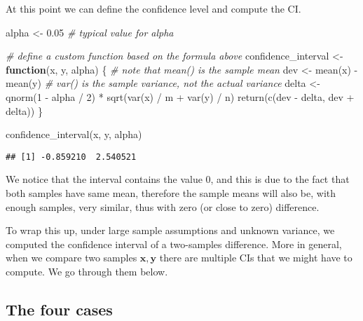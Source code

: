 \documentclass[
  oneside]{book}
\newenvironment{Shaded}{\begin{snugshade}}{\end{snugshade}}
\newcommand{\CommentTok}[1]{\textcolor[rgb]{0.56,0.35,0.01}{\textit{#1}}}
\newcommand{\ControlFlowTok}[1]{\textcolor[rgb]{0.13,0.29,0.53}{\textbf{#1}}}
\newcommand{\DecValTok}[1]{\textcolor[rgb]{0.00,0.00,0.81}{#1}}
\newcommand{\FloatTok}[1]{\textcolor[rgb]{0.00,0.00,0.81}{#1}}
\newcommand{\FunctionTok}[1]{\textcolor[rgb]{0.00,0.00,0.00}{#1}}
\newcommand{\NormalTok}[1]{#1}
\newcommand{\OtherTok}[1]{\textcolor[rgb]{0.56,0.35,0.01}{#1}}
\newcommand{\SpecialCharTok}[1]{\textcolor[rgb]{0.00,0.00,0.00}{#1}}
\begin{document}
At this point we can define the confidence level and compute the CI.

\begin{Shaded}
\begin{Highlighting}[]
\NormalTok{alpha }\OtherTok{\textless{}{-}} \FloatTok{0.05} \CommentTok{\# typical value for alpha}

\CommentTok{\# define a custom function based on the formula above}
\NormalTok{confidence\_interval }\OtherTok{\textless{}{-}} \ControlFlowTok{function}\NormalTok{(x, y, alpha) \{}
  \CommentTok{\# note that mean() is the sample mean}
\NormalTok{  dev }\OtherTok{\textless{}{-}} \FunctionTok{mean}\NormalTok{(x) }\SpecialCharTok{{-}} \FunctionTok{mean}\NormalTok{(y)}
  \CommentTok{\# var() is the sample variance, not the actual variance}
\NormalTok{  delta }\OtherTok{\textless{}{-}} \FunctionTok{qnorm}\NormalTok{(}\DecValTok{1} \SpecialCharTok{{-}}\NormalTok{ alpha }\SpecialCharTok{/} \DecValTok{2}\NormalTok{) }\SpecialCharTok{*} \FunctionTok{sqrt}\NormalTok{(}\FunctionTok{var}\NormalTok{(x) }\SpecialCharTok{/}\NormalTok{ m }\SpecialCharTok{+} \FunctionTok{var}\NormalTok{(y) }\SpecialCharTok{/}\NormalTok{ n)}
  \FunctionTok{return}\NormalTok{(}\FunctionTok{c}\NormalTok{(dev }\SpecialCharTok{{-}}\NormalTok{ delta, dev }\SpecialCharTok{+}\NormalTok{ delta))}
\NormalTok{\}}

\FunctionTok{confidence\_interval}\NormalTok{(x, y, alpha)}
\end{Highlighting}
\end{Shaded}

\begin{verbatim}
## [1] -0.859210  2.540521
\end{verbatim}

We notice that the interval contains the value 0, and this
is due to the fact that both samples have same mean, therefore the
sample means will also be, with enough samples, very similar, thus with
zero (or close to zero) difference.

To wrap this up, under large sample assumptions and unknown variance,
we computed the confidence interval of a two-samples difference.
More in general, when we compare two samples \(\mathbf{x}, \mathbf{y}\)
there are multiple CIs that we might have to compute. We go through
them below.

\hypertarget{the-four-cases}{%
\subsection{The four cases}\label{the-four-cases}}
\end{document}
